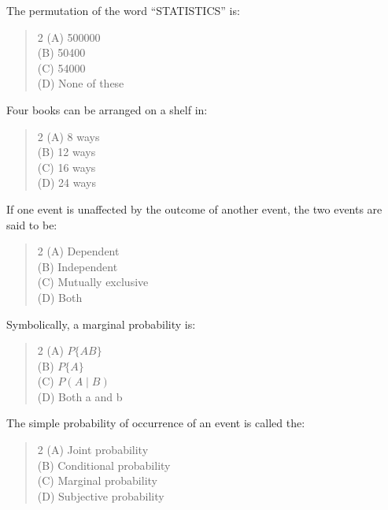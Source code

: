 \documentclass[11pt,a4paper]{article}
\begin{document}
\begin{mcqlist}
\item The permutation of the word ``STATISTICS'' is:
\begin{quote}\begin{multicols}{2}
\noindent (A) 500000 \\
(B) 50400 \\
(C) 54000 \\
(D) None of these
\end{multicols}\end{quote}

\item Four books can be arranged on a shelf in:
\begin{quote}\begin{multicols}{2}
\noindent (A) 8 ways \\
(B) 12 ways \\
(C) 16 ways \\
(D) 24 ways
\end{multicols}\end{quote}

\item If one event is unaffected by the outcome of another event, the two events are said to be:
\begin{quote}\begin{multicols}{2}
\noindent (A) Dependent \\
(B) Independent \\
(C) Mutually exclusive \\
(D) Both
\end{multicols}\end{quote}

\item Symbolically, a marginal probability is:
\begin{quote}\begin{multicols}{2}
\noindent (A) $P\{AB\}$ \\
(B) $P\{A\}$ \\
(C) $P(A\mid B)$ \\
(D) Both a and b
\end{multicols}\end{quote}

\item The simple probability of occurrence of an event is called the:
\begin{quote}\begin{multicols}{2}
\noindent (A) Joint probability \\
(B) Conditional probability \\
(C) Marginal probability \\
(D) Subjective probability
\end{multicols}\end{quote}


\end{mcqlist}
\end{document}
